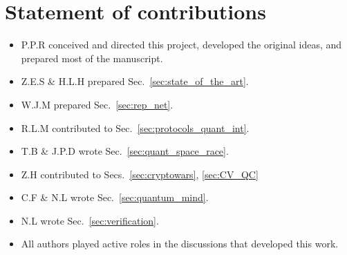 %
%

\section*{Statement of contributions}

\begin{itemize}
\item P.P.R conceived and directed this project, developed the original ideas, and prepared most of the manuscript.
\item Z.E.S \& H.L.H prepared Sec.~\ref{sec:state_of_the_art}.
\item W.J.M prepared Sec.~\ref{sec:rep_net}. 
\item R.L.M contributed to Sec.~\ref{sec:protocols_quant_int}.
\item T.B \& J.P.D wrote Sec.~\ref{sec:quant_space_race}.
\item Z.H contributed to Secs.~\ref{sec:cryptowars}, \ref{sec:CV_QC}
\item C.F \& N.L wrote Sec.~\ref{sec:quantum_mind}.
\item N.L wrote Sec.~\ref{sec:verification}.
\item All authors played active roles in the discussions that developed this work. 
\end{itemize}

